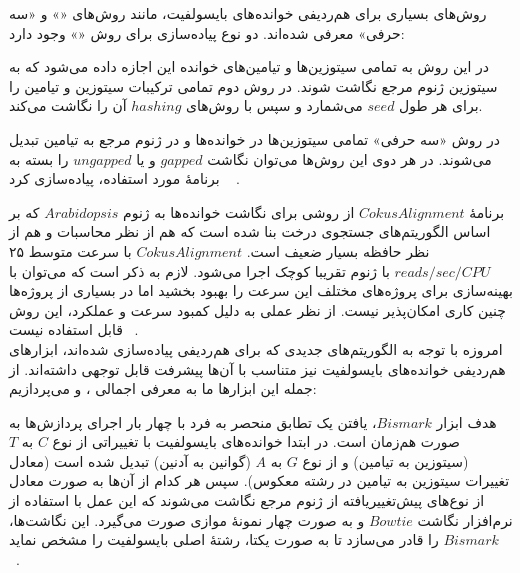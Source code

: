 

روش‌های بسیاری برای هم‌ردیفی خوانده‌های بایسولفیت، مانند روش‌های «» و «سه حرفی» معرفی شده‌اند. دو نوع پیاده‌سازی برای روش «» وجود دارد:

 در این روش به تمامی سیتوزین‌ها و تیامین‌های خوانده این اجازه داده می‌شود که به سیتوزین ژنوم مرجع نگاشت شوند.
 در روش دوم تمامی ترکیبات سیتوزین و تیامین را برای هر طول $seed$ می‌شمارد و سپس با روش‌های $hashing$ آن را نگاشت می‌کند.

در روش «سه حرفی» تمامی سیتوزین‌ها در خوانده‌ها و در ژنوم مرجع به تیامین تبدیل می‌شوند. در هر دوی این روش‌ها می‌توان نگاشت $gapped$ و یا $ungapped$ را بسته به برنامهٔ مورد استفاده، پیاده‌سازی کرد
~\cite{kunde2014comparison}
.


برنامهٔ $CokusAlignment$  از روشی برای نگاشت خوانده‌ها به ژنوم $Arabidopsis$ که بر اساس الگوریتم‌های جستجوی درخت بنا شده است که هم از نظر محاسبات و هم از نظر حافظه بسیار ضعیف است. $CokusAlignment$ با سرعت متوسط ۲۵ $reads/sec/CPU$ با ژنوم تقریبا کوچک اجرا می‌شود. لازم به ذکر است که می‌توان با بهینه‌سازی برای پروژه‌های مختلف این سرعت را بهبود بخشید اما در بسیاری از پروژه‌ها چنین کاری امکان‌پذیر نیست. از نظر عملی به دلیل کمبود سرعت و عملکرد، این روش قابل استفاده نیست
~\cite{xi2009bsmap}.
\\
امروزه با توجه به الگوریتم‌های جدیدی که برای هم‌ردیفی پیاده‌سازی شده‌اند، ابزارهای هم‌ردیفی خوانده‌های بایسولفیت نیز متناسب با آن‌ها پیشرفت قابل توجهی داشته‌اند. از جمله این ابزارها ما به معرفی اجمالی ،  و  می‌پردازیم:


هدف ابزار $Bismark$، یافتن یک تطابق منحصر به فرد با چهار بار اجرای پردازش‌ها به صورت هم‌زمان است. در ابتدا خوانده‌های بایسولفیت با تغییراتی از نوع $C$ به $T$ (سیتوزین به تیامین) و از نوع $G$ به $A$ (گوانین به آدنین) تبدیل شده است (معادل تغییرات سیتوزین به تیامین در رشته معکوس). سپس هر کدام از آن‌ها به صورت معادل از نوع‌های پیش‌تغییریافته از ژنوم مرجع نگاشت می‌شوند که این عمل با استفاده از نرم‌افزار نگاشت $Bowtie$ و به صورت چهار نمونهٔ موازی صورت می‌گیرد. این نگاشت‌ها، $Bismark$ را قادر می‌سازد تا به صورت یکتا، رشتهٔ اصلی بایسولفیت را مشخص نماید
~\cite{krueger2011bismark}.


